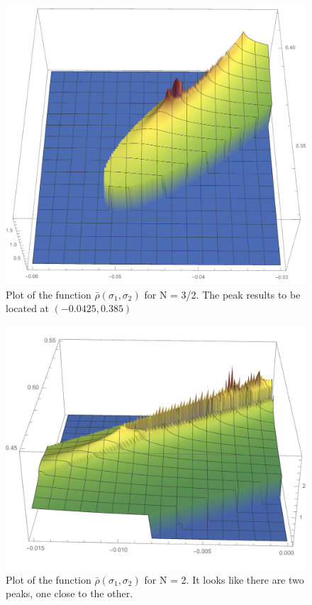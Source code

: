 \begin{figure}
\begin{center}
\includegraphics[scale=0.5]{Immagini/spiked3N1p5.pdf}
\caption{Plot of the function $\bar \rho (\sigma_1, \sigma_2)$ for N = 3/2. The peak results to be located at $(-0.0425, 0.385)$}
\label{fig:1}
\end{center}
\end{figure}


\begin{figure}
\begin{center}
\includegraphics[scale=0.5]{Immagini/spiked3N2front.pdf}
\caption{Plot of the function $\bar \rho (\sigma_1, \sigma_2)$ for N = 2. It looks like there are two peaks, one close to the other.}
\label{fig:2}
\end{center}
\end{figure}


